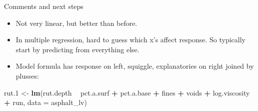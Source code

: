 \documentclass[
  ignorenonframetext,
]{beamer}
\newenvironment{Shaded}{\begin{snugshade}}{\end{snugshade}}
\newcommand{\DataTypeTok}[1]{\textcolor[rgb]{0.13,0.29,0.53}{#1}}
\newcommand{\FloatTok}[1]{\textcolor[rgb]{0.00,0.00,0.81}{#1}}
\newcommand{\KeywordTok}[1]{\textcolor[rgb]{0.13,0.29,0.53}{\textbf{#1}}}
\newcommand{\NormalTok}[1]{#1}
\newcommand{\OperatorTok}[1]{\textcolor[rgb]{0.81,0.36,0.00}{\textbf{#1}}}
\newcommand{\StringTok}[1]{\textcolor[rgb]{0.31,0.60,0.02}{#1}}
\providecommand{\tightlist}{%
  \setlength{\itemsep}{0pt}\setlength{\parskip}{0pt}}
\begin{document}
\begin{frame}[fragile]{Comments and next steps}
\protect\hypertarget{comments-and-next-steps}{}

\begin{itemize}
\tightlist
\item
  Not very linear, but better than before.
\item
  In multiple regression, hard to guess which x's affect response. So
  typically start by predicting from everything else.
\item
  Model formula has response on left, squiggle, explanatories on right
  joined by plusses:
\end{itemize}

\begin{Shaded}
\begin{Highlighting}[]
\NormalTok{rut}\FloatTok{.1}\NormalTok{ <-}\StringTok{ }\KeywordTok{lm}\NormalTok{(rut.depth }\OperatorTok{~}\StringTok{ }\NormalTok{pct.a.surf }\OperatorTok{+}\StringTok{ }\NormalTok{pct.a.base }\OperatorTok{+}\StringTok{ }\NormalTok{fines }\OperatorTok{+}
\StringTok{  }\NormalTok{voids }\OperatorTok{+}\StringTok{ }\NormalTok{log.viscosity }\OperatorTok{+}\StringTok{ }\NormalTok{run, }\DataTypeTok{data =}\NormalTok{ asphalt_lv)}
\end{Highlighting}
\end{Shaded}

\end{frame}
\end{document}
